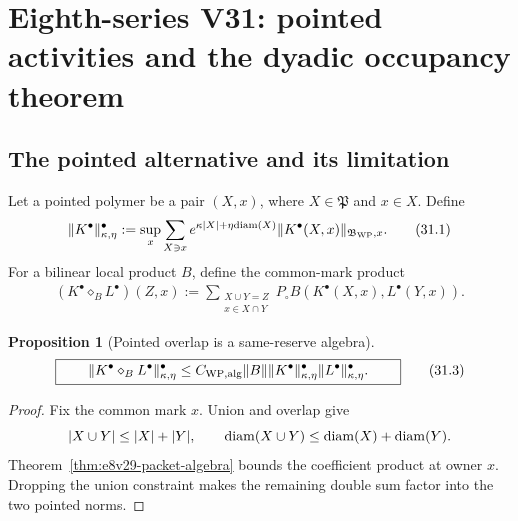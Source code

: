 \documentclass[11pt,oneside]{book}
\newtheorem{proposition}[theorem]{Proposition}
\theoremstyle{definition}
\theoremstyle{remark}
\begin{document}


\section{Eighth-series V31: pointed activities and the dyadic
occupancy theorem}

\subsection{The pointed alternative and its limitation}

Let a pointed polymer be a pair \((X,x)\), where
\(X\in{\mathfrak P}\) and \(x\in X\).  Define
\[
 \|K^\bullet\|_{\kappa,\eta}^{\bullet}
 :=
 \sup_x\sum_{X\ni x}
 e^{\kappa|X|+\eta{\rm diam}(X)}
 \|K^\bullet(X,x)\|_{\mathfrak B_{\rm WP},x}.                    \tag{31.1}
\]
For a bilinear local product \(B\), define the common-mark product
\[
\begin{split}
 (K^\bullet\diamond_BL^\bullet)(Z,x)
 :=
 \sum_{\substack{X\cup Y=Z\\x\in X\cap Y}}
 P_\circ B(K^\bullet(X,x),L^\bullet(Y,x)).
                                                                    \tag{31.2}
\end{split}
\]

\begin{proposition}[Pointed overlap is a same-reserve algebra]
\label{prop:e8v31-pointed}
\[
\boxed{\qquad
 \|K^\bullet\diamond_BL^\bullet\|_{\kappa,\eta}^{\bullet}
 \leq C_{\rm WP,alg}\|B\|
 \|K^\bullet\|_{\kappa,\eta}^{\bullet}
 \|L^\bullet\|_{\kappa,\eta}^{\bullet}.
\qquad}                                                           \tag{31.3}
\]
\end{proposition}

\begin{proof}
Fix the common mark \(x\).  Union and overlap give
\[
 |X\cup Y|\leq|X|+|Y|,\qquad
 {\rm diam}(X\cup Y)\leq{\rm diam}(X)+{\rm diam}(Y).
\]
Theorem~\ref{thm:e8v29-packet-algebra} bounds the coefficient product
at owner \(x\).  Dropping the union constraint makes the remaining
double sum factor into the two pointed norms.
\end{proof}
\end{document}
